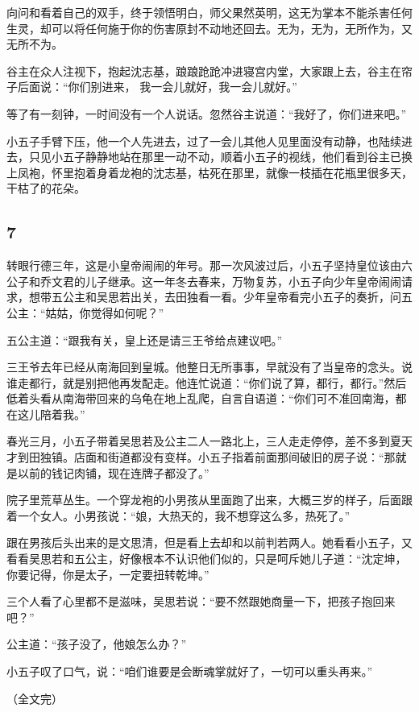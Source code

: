 向问和看着自己的双手，终于领悟明白，师父果然英明，这无为掌本不能杀害任何生灵，却可以将任何施于你的伤害原封不动地还回去。无为，无为，无所作为，又无所不为。

谷主在众人注视下，抱起沈志基，踉踉跄跄冲进寝宫内堂，大家跟上去，谷主在帘子后面说：“你们别进来，
我一会儿就好，我一会儿就好。”

等了有一刻钟，一时间没有一个人说话。忽然谷主说道：“我好了，你们进来吧。”

小五子手臂下压，他一个人先进去，过了一会儿其他人见里面没有动静，也陆续进去，只见小五子静静地站在那里一动不动，顺着小五子的视线，他们看到谷主已换上凤袍，怀里抱着身着龙袍的沈志基，枯死在那里，就像一枝插在花瓶里很多天，干枯了的花朵。
\newline

{\centering\subsection{7}}

转眼行德三年，这是小皇帝闹闹的年号。那一次风波过后，小五子坚持皇位该由六公子和乔文君的儿子继承。这一年冬去春来，万物复苏，小五子向少年皇帝闹闹请求，想带五公主和吴思若出关，去田独看一看。少年皇帝看完小五子的奏折，问五公主：“姑姑，你觉得如何呢？”

五公主道：“跟我有关，皇上还是请三王爷给点建议吧。”

三王爷去年已经从南海回到皇城。他整日无所事事，早就没有了当皇帝的念头。说谁走都行，就是别把他再发配走。他连忙说道：“你们说了算，都行，都行。”然后低着头看从南海带回来的乌龟在地上乱爬，自言自语道：“你们可不准回南海，都在这儿陪着我。”

春光三月，小五子带着吴思若及公主二人一路北上，三人走走停停，差不多到夏天才到田独镇。店面和街道都没有变样。小五子指着前面那间破旧的房子说：“那就是以前的钱记肉铺，现在连牌子都没了。”

院子里荒草丛生。一个穿龙袍的小男孩从里面跑了出来，大概三岁的样子，后面跟着一个女人。小男孩说：“娘，大热天的，我不想穿这么多，热死了。”

跟在男孩后头出来的是文思清，但是看上去却和以前判若两人。她看看小五子，又看看吴思若和五公主，好像根本不认识他们似的，只是呵斥她儿子道：“沈定坤，你要记得，你是太子，一定要扭转乾坤。”

三个人看了心里都不是滋味，吴思若说：“要不然跟她商量一下，把孩子抱回来吧？”

公主道：“孩子没了，他娘怎么办？”

小五子叹了口气，说：“咱们谁要是会断魂掌就好了，一切可以重头再来。”

\hfill（全文完） 